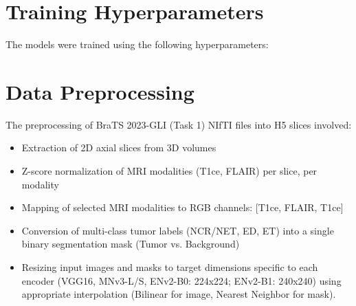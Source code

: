 \begin{theappendices}
  \section{Training Hyperparameters}
  The models were trained using the following hyperparameters:
  \begin{table}[h]
    \centering
    \caption{Training Hyperparameters for AS-Net Variants}
    \label{tab:training_hyperparams}
  \end{table}

  \section{Data Preprocessing}
  The preprocessing of BraTS 2023-GLI (Task 1) NIfTI files into H5 slices involved:
  \begin{itemize}
    \item Extraction of 2D axial slices from 3D volumes
    \item Z-score normalization of MRI modalities (T1ce, FLAIR) per slice, per modality
    \item Mapping of selected MRI modalities to RGB channels: [T1ce, FLAIR, T1ce]
    \item Conversion of multi-class tumor labels (NCR/NET, ED, ET) into a single binary segmentation mask (Tumor vs. Background)
    \item Resizing input images and masks to target dimensions specific to each encoder (VGG16, MNv3-L/S, ENv2-B0: 224x224; ENv2-B1: 240x240) using appropriate interpolation (Bilinear for image, Nearest Neighbor for mask).
  \end{itemize}


\end{theappendices}
